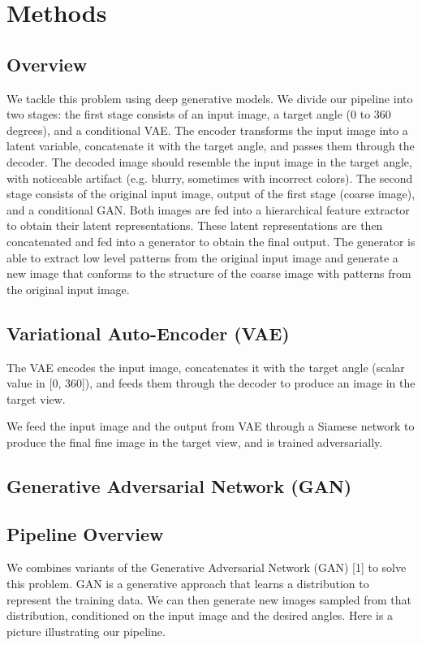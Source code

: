 \documentclass[10pt,conference]{IEEEtran}
\begin{document}
\section{Methods}

\subsection{Overview}

We tackle this problem using deep generative models. We divide our pipeline into two stages: the first stage consists of an input image, a target angle (0 to 360 degrees), and a conditional VAE. The encoder transforms the input image into a latent variable, concatenate it with the target angle, and passes them through the decoder. The decoded image should resemble the input image in the target angle, with noticeable artifact (e.g. blurry, sometimes with incorrect colors). The second stage consists of the original input image, output of the first stage (coarse image), and a conditional GAN. Both images are fed into a hierarchical feature extractor to obtain their latent representations. These latent representations are then concatenated and fed into a generator to obtain the final output. The generator is able to extract low level patterns from the original input image and generate a new image that conforms to the structure of the coarse image with patterns from the original input image.

\subsection{Variational Auto-Encoder (VAE)}

The VAE encodes the input image, concatenates it with
the target angle (scalar value in [0, 360]), and feeds them
through the decoder to produce an image in the target view.

We feed the input image and the output from VAE
through a Siamese network to produce the final fine image
in the target view, and is trained adversarially.

\subsection{Generative Adversarial Network (GAN)}


\subsection{Pipeline Overview}
We combines variants of the Generative Adversarial Network (GAN) [1] to solve this problem. GAN is a generative approach that learns a distribution to represent the training data. We can then generate new images sampled from that distribution, conditioned on the input image and the desired angles. Here is a picture illustrating our pipeline.
\end{document}

